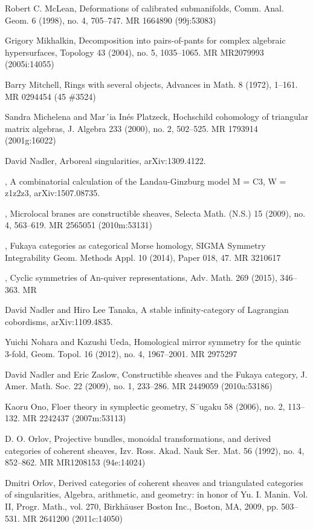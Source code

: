 {\begin{list}{}{%
  \setlength{\leftmargin}{3.4em}%
  \setlength{\itemindent}{-3.4em}%
  \setlength{\itemsep}{1.5pt}%
  \setlength{\parsep}{0pt}%
  \setlength{\listparindent}{0pt}%
}
\item[{[McL98]}] Robert C. McLean, Deformations of calibrated submanifolds, Comm. Anal. Geom. 6 (1998), no. 4, 705--747. MR 1664890 (99j:53083)
\item[{[Mik04]}] Grigory Mikhalkin, Decomposition into pairs-of-pants for complex algebraic hypersurfaces, Topology 43 (2004), no. 5, 1035--1065. MR MR2079993 (2005i:14055)
\item[{[Mit72]}] Barry Mitchell, Rings with several objects, Advances in Math. 8 (1972), 1--161. MR 0294454 (45 \#3524)
\item[{[MP00]}] Sandra Michelena and Mar´ia Inés Platzeck, Hochschild cohomology of triangular matrix algebras, J. Algebra 233 (2000), no. 2, 502--525. MR 1793914 (2001g:16022)
\item[{[Nada]}] David Nadler, Arboreal singularities, arXiv:1309.4122.
\item[{[Nadb]}] , A combinatorial calculation of the Landau-Ginzburg model M = C3, W = z1z2z3, arXiv:1507.08735.
\item[{[Nad09]}] , Microlocal branes are constructible sheaves, Selecta Math. (N.S.) 15 (2009), no. 4, 563--619. MR 2565051 (2010m:53131)
\item[{[Nad14]}] , Fukaya categories as categorical Morse homology, SIGMA Symmetry Integrability Geom. Methods Appl. 10 (2014), Paper 018, 47. MR 3210617
\item[{[Nad15]}] , Cyclic symmetries of An-quiver representations, Adv. Math. 269 (2015), 346--363. MR
\item[{[NT]}] David Nadler and Hiro Lee Tanaka, A stable infinity-category of Lagrangian cobordisms, arXiv:1109.4835.
\item[{[NU12]}] Yuichi Nohara and Kazushi Ueda, Homological mirror symmetry for the quintic 3-fold, Geom. Topol. 16 (2012), no. 4, 1967--2001. MR 2975297
\item[{[NZ09]}] David Nadler and Eric Zaslow, Constructible sheaves and the Fukaya category, J. Amer. Math. Soc. 22 (2009), no. 1, 233--286. MR 2449059 (2010a:53186)
\item[{[Ono06]}] Kaoru Ono, Floer theory in symplectic geometry, S¯ugaku 58 (2006), no. 2, 113--132. MR 2242437 (2007m:53113)
\item[{[Orl92]}] D. O. Orlov, Projective bundles, monoidal transformations, and derived categories of coherent sheaves, Izv. Ross. Akad. Nauk Ser. Mat. 56 (1992), no. 4, 852--862. MR MR1208153 (94e:14024)
\item[{[Orl09]}] Dmitri Orlov, Derived categories of coherent sheaves and triangulated categories of singularities, Algebra, arithmetic, and geometry: in honor of Yu. I. Manin. Vol. II, Progr. Math., vol. 270, Birkhäuser Boston Inc., Boston, MA, 2009, pp. 503--531. MR 2641200 (2011c:14050)

\end{list}}
